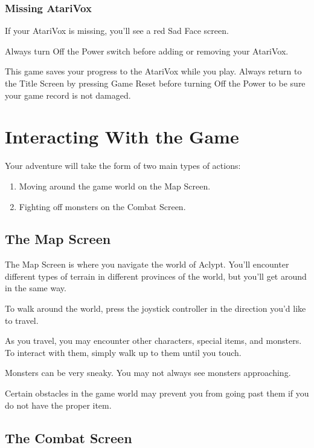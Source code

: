 \documentclass[10pt,twoside,openright]{memoir}
\begin{document}
\subsection{Missing AtariVox}

If your AtariVox is missing, you'll see a red Sad Face screen.

Always   turn  Off   the  Power   switch  before   adding  or   removing
your AtariVox.

This game saves your progress to the AtariVox while you play.  Always
return to the Title Screen by pressing Game Reset before turning Off
the Power to be sure your game record is not damaged.

\chapter{Interacting With the Game}

Your adventure will take the form of two main types of actions:

\begin{enumerate}
\item Moving around the game world on the Map Screen.
\item Fighting off monsters on the Combat Screen.
\end{enumerate}

\section{The Map Screen}

The Map Screen is where you navigate the world of Aclypt. You'll
encounter different types of terrain in different provinces of the
world, but you'll get around in the same way.

To walk around the world, press the joystick controller in the
direction you'd like to travel.

As you travel, you may encounter other characters, special items, and
monsters. To interact with them, simply walk up to them until you
touch.

Monsters can be very sneaky. You may not always see monsters
approaching.

Certain obstacles in the game world may prevent you from going past
them if you do not have the proper item.


\section{The Combat Screen}
\end{document}

